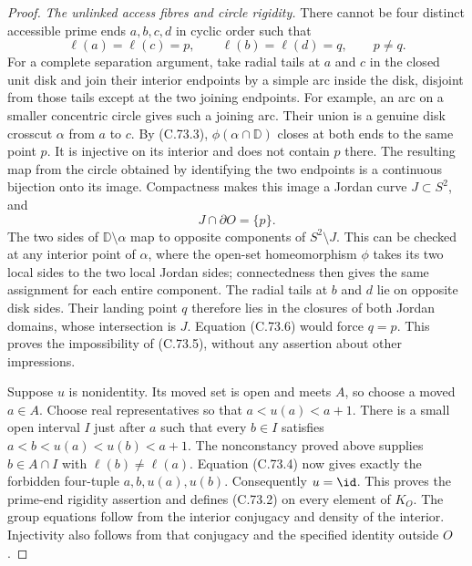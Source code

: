 \begin{proof}
\emph{The unlinked access fibres and circle rigidity.}
There cannot be four distinct accessible prime
ends $a,b,c,d$ in cyclic order such that
\[
                   \ell(a)=\ell(c)=p,\qquad
                   \ell(b)=\ell(d)=q,\qquad p\ne q.
                                                               \tag{C.73.5}
\]
For a complete separation argument, take radial
tails at $a$ and $c$ in the closed unit disk
and join their interior endpoints by a simple
arc inside the disk, disjoint from those tails
except at the two joining endpoints. For example,
an arc on a smaller concentric circle gives
such a joining arc. Their union is a genuine
disk crosscut $\alpha$ from $a$ to $c$.
By (C.73.3), $\phi(\alpha\cap\mathbb D)$
closes at both ends to the same point $p$.
It is injective on its interior and does not
contain $p$ there. The resulting map from the
circle obtained by identifying the two endpoints
is a continuous bijection onto its image.
Compactness makes this image a Jordan curve
$J\subset S^2$, and
\[
                         J\cap\partial O=\{p\}.
                                                               \tag{C.73.6}
\]
The two sides of $\mathbb D\setminus\alpha$
map to opposite components of $S^2\setminus J$.
This can be checked at any interior point of
$\alpha$, where the open-set homeomorphism
$\phi$ takes its two local sides to the two
local Jordan sides; connectedness then gives
the same assignment for each entire component.
The radial tails at $b$ and $d$ lie on opposite
disk sides. Their landing point $q$ therefore
lies in the closures of both Jordan domains,
whose intersection is $J$. Equation (C.73.6)
would force $q=p$. This proves the impossibility
of (C.73.5), without any assertion about other
impressions.

Suppose $u$ is nonidentity. Its moved set is
open and meets $A$, so choose a moved $a\in A$.
Choose real representatives so that
$a<u(a)<a+1$. There is a small open interval
$I$ just after $a$ such that every $b\in I$
satisfies
$a<b<u(a)<u(b)<a+1$.
The nonconstancy proved above supplies
$b\in A\cap I$ with $\ell(b)\ne\ell(a)$.
Equation (C.73.4) now gives exactly the forbidden
four-tuple $a,b,u(a),u(b)$.
Consequently $u=\id$.
This proves the prime-end rigidity assertion
and defines (C.73.2) on every element of $K_O$.
The group equations follow from the interior
conjugacy and density of the interior. Injectivity
also follows from that conjugacy and the specified
identity outside $O$.


\end{proof}
